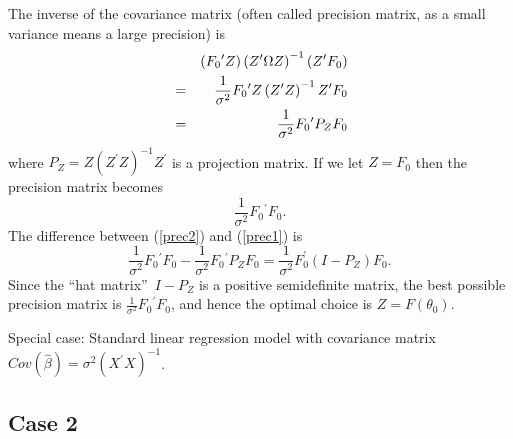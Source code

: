 \documentclass{article}
\begin{document}
The inverse of the covariance matrix (often called precision matrix, as a
small variance means a large precision) is%
\begin{eqnarray}
&&\left( F_{0}{}^{\prime }Z\right) \left( Z^{\prime }\Omega Z\right)
^{-1}\left( Z^{\prime }F_{0}\right)  \notag \\
&=&\frac{1}{\sigma ^{2}}F_{0}{}^{\prime }Z\left( Z^{\prime }Z\right)
^{-1}Z^{\prime }F_{0}  \notag \\
&=&\frac{1}{\sigma ^{2}}F_{0}{}^{\prime }P_{Z}F_{0}  \label{prec1}
\end{eqnarray}%
where $P_{Z}=Z\left( Z^{\prime }Z\right) ^{-1}Z^{\prime }$ is a projection
matrix. If we let $Z=F_{0}$ then the precision matrix becomes%
\begin{equation}
\frac{1}{\sigma ^{2}}F_{0}{}^{\prime }F_{0}.  \label{prec2}
\end{equation}%
The difference between (\ref{prec2}) and (\ref{prec1}) is%
\begin{equation*}
\frac{1}{\sigma ^{2}}F_{0}{}^{\prime }F_{0}-\frac{1}{\sigma ^{2}}%
F_{0}{}^{\prime }P_{Z}F_{0}=\frac{1}{\sigma ^{2}}F_{0}^{\prime
}(I-P_{Z})F_{0}\text{.}
\end{equation*}%
Since the \textquotedblleft hat matrix\textquotedblright\ $I-P_{Z}$ is a
positive semidefinite matrix, the best possible precision matrix is $\frac{1%
}{\sigma ^{2}}F_{0}{}^{\prime }F_{0}$, and hence the optimal choice is $%
Z=F(\theta _{0})$.

Special case: Standard linear regression model with covariance matrix $Cov(%
\hat{\beta})=\sigma ^{2}(X^{\prime }X)^{-1}$.

\subsection{Case 2}
\end{document}
